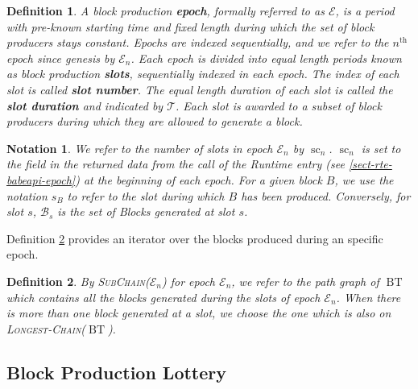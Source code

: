 \documentclass{book}
\newcommand{\tmname}[1]{\textsc{#1}}
\newcommand{\tmop}[1]{\ensuremath{\operatorname{#1}}}
\newcommand{\tmstrong}[1]{\textbf{#1}}
\newcommand{\tmtextbf}[1]{{\bfseries{#1}}}
\newcommand{\tmtextsc}[1]{{\scshape{#1}}}
\newcommand{\tmtexttt}[1]{{\ttfamily{#1}}}
\newcommand{\tmverbatim}[1]{{\ttfamily{#1}}}
\newtheorem{definition}{Definition}
\newtheorem{notation}{Notation}
\providecommand{\tmname}[1]{\tmtextsc{#1}}
\providecommand{\tmop}[1]{\ensuremath{\mathrm{#1}}}
\providecommand{\tmstrong}[1]{\tmtextbf{#1}}
\providecommand{\tmtextbf}[1]{\tmtextbf{#1}}
\providecommand{\tmverbatim}[1]{\tmtexttt{#1}}
\newtheorem{definition}{Definition}
\newtheorem{notation}{Notation}
\begin{document}
\begin{definition}
  \label{defn-epoch-slot}A block production {\tmstrong{epoch}}, formally
  referred to as $\mathcal{E}$, is a period with pre-known starting time and
  fixed length during which the set of block producers stays constant. Epochs
  are indexed sequentially, and we refer to the $n^{\tmop{th}}$ epoch since
  genesis by $\mathcal{E}_n$. Each epoch is divided into equal length periods
  known as block production {\tmstrong{slots}}, sequentially indexed in each
  epoch. The index of each slot is called {\tmstrong{slot number}}. The equal
  length duration of each slot is called the {\tmstrong{slot duration}} and
  indicated by $\mathcal{T}$. Each slot is awarded to a subset of block
  producers during which they are allowed to generate a block.
\end{definition}

\begin{notation}
  \label{note-slot}We refer to the number of slots in epoch $\mathcal{E}_n$ by
  $\tmop{sc}_n$. $\tmop{sc}_n$ is set to the \tmverbatim{duration} field in
  the returned data from the call of the Runtime entry
  \tmverbatim{BabeApi\_configuration} (see \ref{sect-rte-babeapi-epoch}) at
  the beginning of each epoch. For a given block $B$, we use the notation
  {\tmstrong{$s_B$}} to refer to the slot during which $B$ has been produced.
  Conversely, for slot $s$, $\mathcal{B}_s$ is the set of Blocks generated at
  slot $s$.
\end{notation}

Definition \ref{defn-epoch-subchain} provides an iterator over the blocks
produced during an specific epoch.

\begin{definition}
  \label{defn-epoch-subchain} By {\tmname{SubChain($\mathcal{E}_n$)}} for
  epoch $\mathcal{E}_n$, we refer to the path graph of $\tmop{BT}$ which
  contains all the blocks generated during the slots of epoch $\mathcal{E}_n$.
  When there is more than one block generated at a slot, we choose the one
  which is also on {\tmname{Longest-Chain($\tmop{BT}$)}}.
\end{definition}

\subsection{Block Production Lottery}
\end{document}
